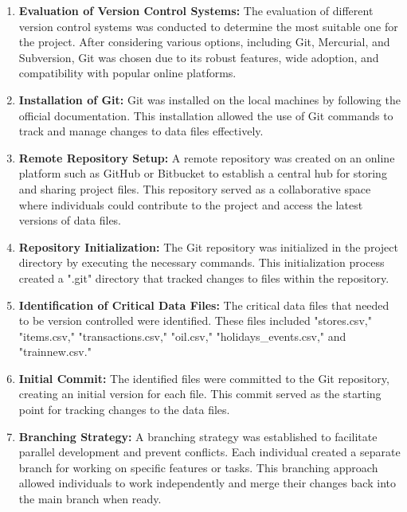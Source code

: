 	\begin{enumerate}[label=\textbf{\arabic*.}]
		\item \textbf{Evaluation of Version Control Systems:} The evaluation of different version control systems was conducted to determine the most suitable one for the project. After considering various options, including Git, Mercurial, and Subversion, Git was chosen due to its robust features, wide adoption, and compatibility with popular online platforms.
		
		\item \textbf{Installation of Git:} Git was installed on the local machines by following the official documentation. This installation allowed the use of Git commands to track and manage changes to data files effectively.
		
		\item \textbf{Remote Repository Setup:} A remote repository was created on an online platform such as GitHub or Bitbucket to establish a central hub for storing and sharing project files. This repository served as a collaborative space where individuals could contribute to the project and access the latest versions of data files.
		
		\item \textbf{Repository Initialization:} The Git repository was initialized in the project directory by executing the necessary commands. This initialization process created a ".git" directory that tracked changes to files within the repository.
		
		\item \textbf{Identification of Critical Data Files:} The critical data files that needed to be version controlled were identified. These files included "stores.csv," "items.csv," "transactions.csv," "oil.csv," "holidays\_events.csv," and "trainnew.csv."
		
		\item \textbf{Initial Commit:} The identified files were committed to the Git repository, creating an initial version for each file. This commit served as the starting point for tracking changes to the data files.
		
		\item \textbf{Branching Strategy:} A branching strategy was established to facilitate parallel development and prevent conflicts. Each individual created a separate branch for working on specific features or tasks. This branching approach allowed individuals to work independently and merge their changes back into the main branch when ready.
		

\end{enumerate}

